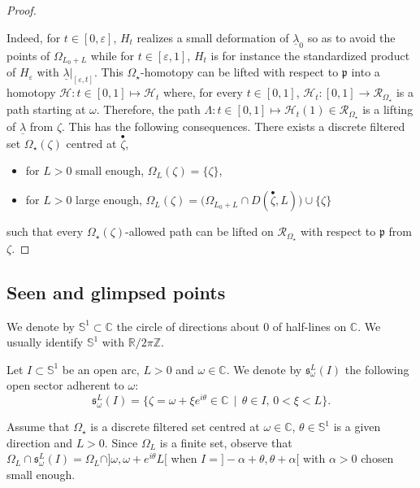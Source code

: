 \documentclass[11pt, english]{smfart}
\theoremstyle{definition}
\begin{document}
\begin{proof}
\begin{itemize}
\end{itemize}
Indeed, for $t \in [0,\varepsilon]$, $H_t$ realizes a small deformation
of $\underline{\lambda}_0$ so as to avoid the points of $\Omega_{L_0+L}$  while for $t
\in [\varepsilon,1]$, $H_t$ is for instance the standardized product of
$H_\varepsilon$ with $\underline{\lambda}|_{[\varepsilon, t]}$.
This $\Omega_\star$-homotopy can be lifted  with
respect to $\mathfrak{p}$ into a homotopy
$\mathcal{H}  : t \in [0,1] \mapsto \mathcal{H}_t$
where, for every $t \in [0,1]$, $\mathcal{H}_t : [0,1] \to
\mathscr{R}_{\Omega_\star}$ is a path starting at
$\omega$. Therefore, the path $\Lambda : t \in [0,1] \mapsto
\mathcal{H}_t(1) \in \mathscr{R}_{\Omega_\star}$ is a lifting of
$\underline{\lambda}$  from $\zeta$.
This has the following consequences. There exists a  discrete
filtered set $\Omega_\star(\zeta)$ centred at ${ {\stackrel{\bullet}{\zeta}} }$, 
\begin{itemize}
\item for $L>0$ small enough, $\Omega_{L}(\zeta) =  \{\zeta\}$,
\item for $L>0$ large enough,
$\displaystyle  \Omega_{L}(\zeta) = \big( \Omega_{L_0+L} \cap D({ {\stackrel{\bullet}{\zeta}} }, L)
\big) \cup \{\zeta\} $
\end{itemize}
such that every $\Omega_\star(\zeta)$-allowed path can be lifted on
$\mathscr{R}_{\Omega_\star}$  with respect to $\mathfrak{p}$ from $\zeta$.
\end{proof}

\subsection{Seen and glimpsed points}\label{sectionseen}

We denote by $\mathbb{S}^1 \subset \mathbb{C}$  the circle of
directions 
about $0$ of
half-lines  on $\mathbb{C}$. We  usually identify $\mathbb{S}^1$  with
$\mathbb{R}/2\pi\mathbb{Z}$.

\begin{defi}
Let  $I \subset \mathbb{S}^1$ be an open arc, $L>0$ and $\omega \in
\mathbb{C}$.  We denote by 
${ {\boldsymbol{\mathfrak{s}}} }{_\omega^L}(I)$ the following open sector adherent to $\omega$:
$${\displaystyle { {\boldsymbol{\mathfrak{s}}} }{_\omega^L}(I) = \{\zeta = \omega+
\xi e^{i\theta} \in 
\mathbb{C} \, \mid \, \theta \in I, \, 0 <\xi <L \}}.$$
\end{defi}

Assume that  $\Omega_\star$ is a discrete filtered set centred at
$\omega \in \mathbb{C}$,  $\theta \in \mathbb{S}^1$ is a given
direction and $L>0$.  Since $\Omega_L$ is a
finite set, observe that 
${\Omega_L \cap { {\boldsymbol{\mathfrak{s}}} }{_\omega^L}(I) = \Omega_L \cap ]\omega, \omega+e^{i\theta}L[}$ when
$I=]-\alpha+\theta, \theta+\alpha[$ with $\alpha>0$ chosen small enough.
\end{document}
